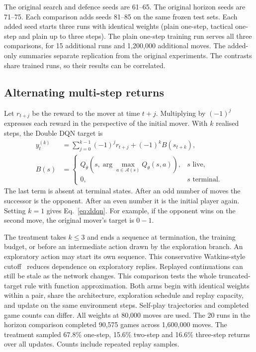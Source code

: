 \documentclass[letterpaper]{article}
\begin{document}
The original search and defence seeds are 61--65. The original horizon
seeds are 71--75. Each comparison adds seeds 81--85 on the same frozen
test sets. Each added seed starts three runs with identical weights
(plain one-step, tactical one-step and plain up to three steps).
The plain one-step training run serves all three comparisons, for 15
additional runs and 1,200,000 additional moves. The added-only summaries
separate replication from the original experiments. The contrasts share
trained runs, so their results can be correlated.

\subsection{Alternating multi-step returns}
Let $r_{t+j}$ be the reward to the mover at time $t+j$. Multiplying by
$(-1)^j$ expresses each reward in the perspective of the initial mover.
With $k$ realised steps, the Double DQN target is
\begin{equation}
 \begin{aligned}
 y_t^{(k)} &= \sum_{j=0}^{k-1} (-1)^j r_{t+j} + (-1)^k B(s_{t+k}),\\
 B(s) &= \begin{cases}
 Q_{\bar\theta}(s,\arg\max_{a\in\mathcal A(s)}Q_\theta(s,a)), & s\text{ live},\\
 0, & s\text{ terminal}.
 \end{cases}
 \end{aligned}
 \label{eq:multi-step}
\end{equation}
The last term is absent at terminal states. After an odd number of moves
the successor is the opponent. After an even number it is the initial
player again. Setting $k=1$ gives Eq.~\eqref{eq:ddqn}. For example, if the
opponent wins on the second move, the original mover's target is $0-1$.

The treatment takes $k\leq3$ and ends a sequence at termination, the
training budget, or before an intermediate action drawn by the
exploration branch. An exploratory action may start its own sequence.
This conservative Watkins-style cutoff~\cite{munos2016} reduces dependence
on exploratory replies. Replayed continuations can still be stale as the
network changes. This comparison tests the whole truncated-target rule
with function approximation. Both arms begin with identical weights
within a pair, share the architecture, exploration schedule and replay
capacity, and update on the same environment steps. Self-play trajectories
and completed game counts can differ. All weights at 80,000 moves are used.
The 20 runs in the horizon comparison completed 90,575 games across
1,600,000 moves. The treatment sampled 67.8\% one-step,
15.6\% two-step and 16.6\% three-step returns
over all updates. Counts include repeated replay samples.
\end{document}
